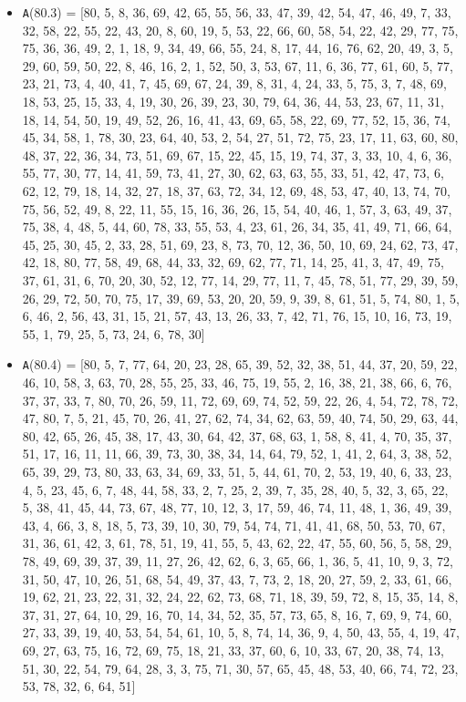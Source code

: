 \documentclass[runningheads, a4paper]{llncs}
\begin{document}
\begin{itemize}
	\item {\texttt A(80.3) = } [80, 5, 8, 36, 69, 42, 65, 55, 56, 33, 47, 39, 42, 54, 47, 46, 49, 7, 33, 32, 58, 22, 55, 22, 43, 20, 8, 60, 19, 5, 53, 22, 66, 60, 58, 54, 22, 42, 29, 77, 75, 75, 36, 36, 49, 2, 1, 18, 9, 34, 49, 66, 55, 24, 8, 17, 44, 16, 76, 62, 20, 49, 3, 5, 29, 60, 59, 50, 22, 8, 46, 16, 2, 1, 52, 50, 3, 53, 67, 11, 6, 36, 77, 61, 60, 5, 77, 23, 21, 73, 4, 40, 41, 7, 45, 69, 67, 24, 39, 8, 31, 4, 24, 33, 5, 75, 3, 7, 48, 69, 18, 53, 25, 15, 33, 4, 19, 30, 26, 39, 23, 30, 79, 64, 36, 44, 53, 23, 67, 11, 31, 18, 14, 54, 50, 19, 49, 52, 26, 16, 41, 43, 69, 65, 58, 22, 69, 77, 52, 15, 36, 74, 45, 34, 58, 1, 78, 30, 23, 64, 40, 53, 2, 54, 27, 51, 72, 75, 23, 17, 11, 63, 60, 80, 48, 37, 22, 36, 34, 73, 51, 69, 67, 15, 22, 45, 15, 19, 74, 37, 3, 33, 10, 4, 6, 36, 55, 77, 30, 77, 14, 41, 59, 73, 41, 27, 30, 62, 63, 63, 55, 33, 51, 42, 47, 73, 6, 62, 12, 79, 18, 14, 32, 27, 18, 37, 63, 72, 34, 12, 69, 48, 53, 47, 40, 13, 74, 70, 75, 56, 52, 49, 8, 22, 11, 55, 15, 16, 36, 26, 15, 54, 40, 46, 1, 57, 3, 63, 49, 37, 75, 38, 4, 48, 5, 44, 60, 78, 33, 55, 53, 4, 23, 61, 26, 34, 35, 41, 49, 71, 66, 64, 45, 25, 30, 45, 2, 33, 28, 51, 69, 23, 8, 73, 70, 12, 36, 50, 10, 69, 24, 62, 73, 47, 42, 18, 80, 77, 58, 49, 68, 44, 33, 32, 69, 62, 77, 71, 14, 25, 41, 3, 47, 49, 75, 37, 61, 31, 6, 70, 20, 30, 52, 12, 77, 14, 29, 77, 11, 7, 45, 78, 51, 77, 29, 39, 59, 26, 29, 72, 50, 70, 75, 17, 39, 69, 53, 20, 20, 59, 9, 39, 8, 61, 51, 5, 74, 80, 1, 5, 6, 46, 2, 56, 43, 31, 15, 21, 57, 43, 13, 26, 33, 7, 42, 71, 76, 15, 10, 16, 73, 19, 55, 1, 79, 25, 5, 73, 24, 6, 78, 30]
	\item {\texttt A(80.4) = } [80, 5, 7, 77, 64, 20, 23, 28, 65, 39, 52, 32, 38, 51, 44, 37, 20, 59, 22, 46, 10, 58, 3, 63, 70, 28, 55, 25, 33, 46, 75, 19, 55, 2, 16, 38, 21, 38, 66, 6, 76, 37, 37, 33, 7, 80, 70, 26, 59, 11, 72, 69, 69, 74, 52, 59, 22, 26, 4, 54, 72, 78, 72, 47, 80, 7, 5, 21, 45, 70, 26, 41, 27, 62, 74, 34, 62, 63, 59, 40, 74, 50, 29, 63, 44, 80, 42, 65, 26, 45, 38, 17, 43, 30, 64, 42, 37, 68, 63, 1, 58, 8, 41, 4, 70, 35, 37, 51, 17, 16, 11, 11, 66, 39, 73, 30, 38, 34, 14, 64, 79, 52, 1, 41, 2, 64, 3, 38, 52, 65, 39, 29, 73, 80, 33, 63, 34, 69, 33, 51, 5, 44, 61, 70, 2, 53, 19, 40, 6, 33, 23, 4, 5, 23, 45, 6, 7, 48, 44, 58, 33, 2, 7, 25, 2, 39, 7, 35, 28, 40, 5, 32, 3, 65, 22, 5, 38, 41, 45, 44, 73, 67, 48, 77, 10, 12, 3, 17, 59, 46, 74, 11, 48, 1, 36, 49, 39, 43, 4, 66, 3, 8, 18, 5, 73, 39, 10, 30, 79, 54, 74, 71, 41, 41, 68, 50, 53, 70, 67, 31, 36, 61, 42, 3, 61, 78, 51, 19, 41, 55, 5, 43, 62, 22, 47, 55, 60, 56, 5, 58, 29, 78, 49, 69, 39, 37, 39, 11, 27, 26, 42, 62, 6, 3, 65, 66, 1, 36, 5, 41, 10, 9, 3, 72, 31, 50, 47, 10, 26, 51, 68, 54, 49, 37, 43, 7, 73, 2, 18, 20, 27, 59, 2, 33, 61, 66, 19, 62, 21, 23, 22, 31, 32, 24, 22, 62, 73, 68, 71, 18, 39, 59, 72, 8, 15, 35, 14, 8, 37, 31, 27, 64, 10, 29, 16, 70, 14, 34, 52, 35, 57, 73, 65, 8, 16, 7, 69, 9, 74, 60, 27, 33, 39, 19, 40, 53, 54, 54, 61, 10, 5, 8, 74, 14, 36, 9, 4, 50, 43, 55, 4, 19, 47, 69, 27, 63, 75, 16, 72, 69, 75, 18, 21, 33, 37, 60, 6, 10, 33, 67, 20, 38, 74, 13, 51, 30, 22, 54, 79, 64, 28, 3, 3, 75, 71, 30, 57, 65, 45, 48, 53, 40, 66, 74, 72, 23, 53, 78, 32, 6, 64, 51]

\end{itemize}
\end{document}
